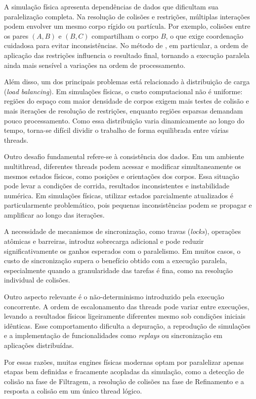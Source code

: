 A simulação física apresenta dependências de dados que dificultam sua paralelização completa. Na resolução de colisões e restrições, múltiplas interações podem envolver um mesmo corpo rígido ou partícula. Por exemplo, colisões entre os pares $(A,B)$ e $(B,C)$ compartilham o corpo $B$, o que exige coordenação cuidadosa para evitar inconsistências. No método de , em particular, a ordem de aplicação das restrições influencia o resultado final, tornando a execução paralela ainda mais sensível a variações na ordem de processamento.

Além disso, um dos principais problemas está relacionado à distribuição de carga (\textit{load balancing}). Em simulações físicas, o custo computacional não é uniforme: regiões do espaço com maior densidade de corpos exigem mais testes de colisão e mais iterações de resolução de restrições, enquanto regiões esparsas demandam pouco processamento. Como essa distribuição varia dinamicamente ao longo do tempo, torna-se difícil dividir o trabalho de forma equilibrada entre várias threads.

Outro desafio fundamental refere-se à consistência dos dados. Em um ambiente multithread, diferentes threads podem acessar e modificar simultaneamente os mesmos estados físicos, como posições e orientações dos corpos. Essa situação pode levar a condições de corrida, resultados inconsistentes e instabilidade numérica. Em simulações físicas, utilizar estados parcialmente atualizados é particularmente problemático, pois pequenas inconsistências podem se propagar e amplificar ao longo das iterações.

A necessidade de mecanismos de sincronização, como travas (\textit{locks}), operações atômicas e barreiras, introduz sobrecarga adicional e pode reduzir significativamente os ganhos esperados com o paralelismo. Em muitos casos, o custo de sincronização supera o benefício obtido com a execução paralela, especialmente quando a granularidade das tarefas é fina, como na resolução individual de colisões.

Outro aspecto relevante é o não-determinismo introduzido pela execução concorrente. A ordem de escalonamento das threads pode variar entre execuções, levando a resultados físicos ligeiramente diferentes mesmo sob condições iniciais idênticas. Esse comportamento dificulta a depuração, a reprodução de simulações e a implementação de funcionalidades como \textit{replays} ou sincronização em aplicações distribuídas.

Por essas razões, muitas engines físicas modernas optam por paralelizar apenas etapas bem definidas e fracamente acopladas da simulação, como a detecção de colisão na fase de Filtragem, a resolução de colisões na fase de Refinamento e a resposta a colisão em um único thread lógico.

